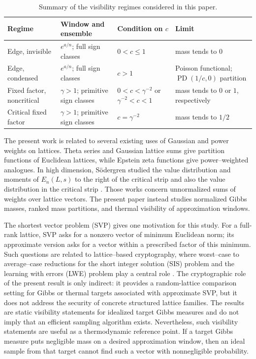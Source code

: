 \documentclass[a4paper,12pt]{article}
\theoremstyle{definition}
\theoremstyle{remark}
\newcommand{\PD}{\operatorname{PD}}
\begin{document}
\begin{table}[t]
\centering
\footnotesize
\setlength{\tabcolsep}{3pt}
\renewcommand{\arraystretch}{1.15}
\begin{tabular}{|p{}|p{}|p{}|p{}|}
\hline
Regime & Window and ensemble & Condition on $c$ & Limit \\
\hline
Edge, invisible &
$e^{a/n}$; full sign classes &
$0<c\leq 1$ &
mass tends to $0$ \\
\hline
Edge, condensed &
$e^{a/n}$; full sign classes &
$c>1$ &
Poisson functional; $\PD(1/c,0)$ partition \\
\hline\hline
Fixed factor, noncritical &
$\gamma>1$; primitive sign classes &
$0<c<\gamma^{-2}$ or $\gamma^{-2}<c<1$ &
mass tends to $0$ or $1$, respectively \\
\hline
Critical fixed factor &
$\gamma>1$; primitive sign classes &
$c=\gamma^{-2}$ &
mass tends to $1/2$ \\
\hline
\end{tabular}
\caption{Summary of the visibility regimes considered in this paper.}
\label{tab:main-regimes}
\end{table}
%
The present work is related to several existing uses of Gaussian and power weights on lattices.
Theta series and Gaussian lattice sums give partition functions of Euclidean
lattices, while Epstein zeta functions give power--weighted analogues.
In high dimension, S\"odergren studied the value distribution and moments of
$E_n(L,s)$ to the right of the critical strip and also the value distribution
in the critical strip \cite{Sodergren10,Sodergren13}.
Those works concern unnormalized sums of weights over lattice vectors.
The present paper instead studies normalized Gibbs masses, ranked mass
partitions, and thermal visibility of approximation windows.

The shortest vector problem (SVP) gives one motivation for this study.
For a full-rank lattice, SVP asks for a nonzero vector of minimum Euclidean norm; its approximate version asks for a vector within a prescribed factor of this minimum.
Such questions are related to lattice--based cryptography, where worst--case to average--case reductions for the short integer solution (SIS) problem and the learning with errors (LWE) problem play a central role \cite{Ajtai96,MG02,Regev09,MicciancioRegev07}.
The cryptographic role of the present result is only indirect: it provides a random-lattice comparison setting for Gibbs or thermal targets associated with approximate SVP, but it does not address the security of concrete structured lattice families.
%
The results are static visibility statements for idealized target Gibbs
measures and do not imply that an efficient sampling algorithm exists.
Nevertheless, such visibility statements are useful as a thermodynamic reference point.
If a target Gibbs measure puts negligible mass on a desired approximation
window, then an ideal sample from that target cannot find such a vector with
nonnegligible probability.
\end{document}
